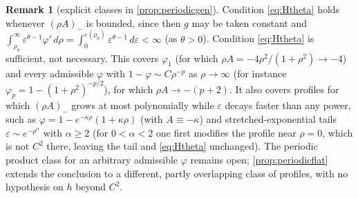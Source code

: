 \documentclass[11pt]{article}
\theoremstyle{definition}
\newtheorem{remark}[theorem]{Remark}
\begin{document}
\begin{remark}[explicit classes in \cref{prop:periodicgen}]\label{rem:periodicgen}
Condition \eqref{eq:Htheta} holds whenever $(\rho A)_-$ is bounded, since
then $g$ may be taken constant and
$\int_{\rho_0}^\infty\varepsilon^{\theta-1}\varphi'\,d\rho
=\int_0^{\varepsilon(\rho_0)}\varepsilon^{\theta-1}\,d\varepsilon<\infty$
(as $\theta>0$).
Condition \eqref{eq:Htheta} is sufficient, not necessary.
This covers $\varphi_1$ (for which $\rho A=-4\rho^2/(1+\rho^2)\to-4$) and
every admissible $\varphi$ with $1-\varphi\sim C\rho^{-p}$ as $\rho\to\infty$
(for instance $\varphi_p=1-(1+\rho^2)^{-p/2}$), for which $\rho A\to-(p+2)$.  It also covers profiles for which $(\rho A)_-$ grows at
most polynomially while $\varepsilon$ decays faster than any power, such as
$\varphi=1-e^{-\kappa\rho}(1+\kappa\rho)$ (with $A\equiv-\kappa$) and
stretched-exponential tails $\varepsilon\sim e^{-\rho^\alpha}$ with
$\alpha\ge2$ (for $0<\alpha<2$ one first modifies the profile near $\rho=0$,
which is not $C^2$ there, leaving the tail and \eqref{eq:Htheta} unchanged).
The periodic product class for an arbitrary admissible $\varphi$ remains
open; \cref{prop:periodicflat} extends the conclusion to a different, partly
overlapping class of profiles, with no hypothesis on $h$ beyond $C^2$.
\end{remark}
\end{document}
